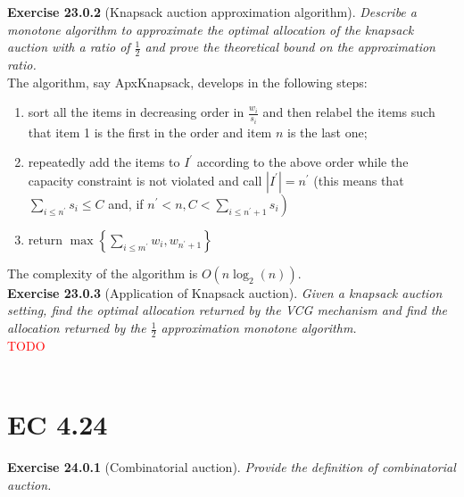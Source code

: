 \textbf{Exercise 23.0.2} (Knapsack auction approximation algorithm). \textit{Describe a monotone algorithm to approximate the optimal allocation of the knapsack auction with a ratio of $\frac{1}{2}$ and prove the theoretical bound on the approximation ratio.}\\

The algorithm, say ApxKnapsack, develops in the following steps:
\begin{enumerate}
\item sort all the items in decreasing order in $\frac{w_{i}}{s_{i}}$ and then relabel the items such that item 1 is the first in the order and item $n$ is the last one;
\item repeatedly add the items to $I^{\prime}$ according to the above order while the capacity constraint is not violated and call $\left|I^{\prime}\right|=n^{\prime}$ (this means that $\sum_{i \leqslant n^{\prime}} s_{i} \leqslant C$ and, if $\left.n^{\prime}<n, C<\sum_{i \leqslant n^{\prime}+1} s_{i}\right)$
\item return $\max \left\{\sum_{i \leqslant m^{\prime}} w_{i}, w_{n^{\prime}+1}\right\}$
\end{enumerate}
The complexity of the algorithm is $O\left(n \log _{2}(n)\right)$.\\

\textbf{Exercise 23.0.3} (Application of Knapsack auction). \textit{Given a knapsack auction setting, find the optimal allocation returned by the VCG mechanism and find the allocation returned by the $\frac{1}{2}$ approximation monotone algorithm.}\\

\textcolor{red}{TODO}\\\\

\section{EC 4.24}

\textbf{Exercise 24.0.1} (Combinatorial auction). \textit{Provide the definition of combinatorial auction.}\\

